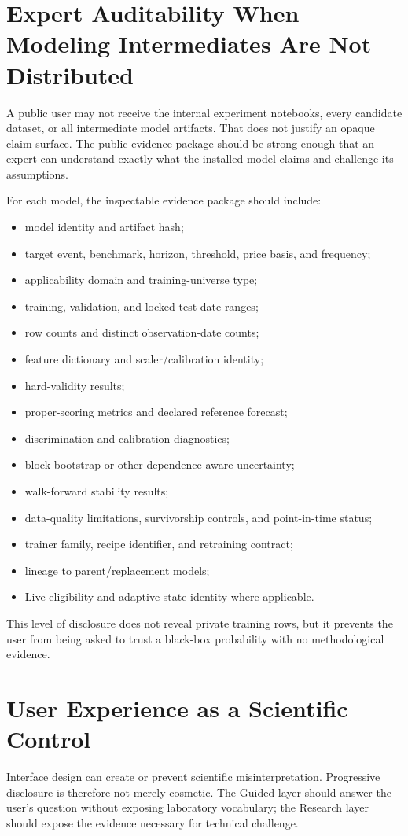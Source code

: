 \documentclass[11pt]{article}
\begin{document}
\section{Expert Auditability When Modeling Intermediates Are Not Distributed}
A public user may not receive the internal experiment notebooks, every candidate dataset, or all intermediate model artifacts. That does not justify an opaque claim surface. The public evidence package should be strong enough that an expert can understand exactly what the installed model claims and challenge its assumptions.

For each model, the inspectable evidence package should include:
\begin{itemize}[itemsep=0.2em]
\item model identity and artifact hash;
\item target event, benchmark, horizon, threshold, price basis, and frequency;
\item applicability domain and training-universe type;
\item training, validation, and locked-test date ranges;
\item row counts and distinct observation-date counts;
\item feature dictionary and scaler/calibration identity;
\item hard-validity results;
\item proper-scoring metrics and declared reference forecast;
\item discrimination and calibration diagnostics;
\item block-bootstrap or other dependence-aware uncertainty;
\item walk-forward stability results;
\item data-quality limitations, survivorship controls, and point-in-time status;
\item trainer family, recipe identifier, and retraining contract;
\item lineage to parent/replacement models;
\item Live eligibility and adaptive-state identity where applicable.
\end{itemize}
This level of disclosure does not reveal private training rows, but it prevents the user from being asked to trust a black-box probability with no methodological evidence.

\section{User Experience as a Scientific Control}
Interface design can create or prevent scientific misinterpretation. Progressive disclosure is therefore not merely cosmetic. The Guided layer should answer the user's question without exposing laboratory vocabulary; the Research layer should expose the evidence necessary for technical challenge.
\end{document}
